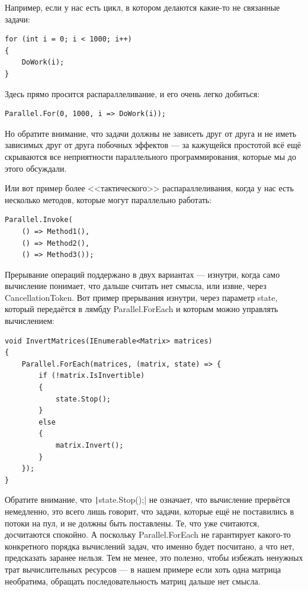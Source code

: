 \documentclass{../../text-style}
\begin{document}
Например, если у нас есть цикл, в котором делаются какие-то не связанные задачи:

\begin{verbatim}
for (int i = 0; i < 1000; i++) 
{
    DoWork(i);
}
\end{verbatim}

Здесь прямо просится распараллеливание, и его очень легко добиться:

\begin{verbatim}
Parallel.For(0, 1000, i => DoWork(i));
\end{verbatim}

Но обратите внимание, что задачи должны не зависеть друг от друга и не иметь зависимых друг от друга побочных эффектов --- за кажущейся простотой всё ещё скрываются все неприятности параллельного программирования, которые мы до этого обсуждали.

Или вот пример более <<тактического>> распараллеливания, когда у нас есть несколько методов, которые могут параллельно работать:

\begin{verbatim}
Parallel.Invoke(
    () => Method1(),
    () => Method2(),
    () => Method3());
\end{verbatim}

Прерывание операций поддержано в двух вариантах --- изнутри, когда само вычисление понимает, что дальше считать нет смысла, или извне, через CancellationToken. Вот пример прерывания изнутри, через параметр state, который передаётся в лямбду Parallel.ForEach и которым можно управлять вычислением:

\begin{verbatim}
void InvertMatrices(IEnumerable<Matrix> matrices)
{
    Parallel.ForEach(matrices, (matrix, state) => {
        if (!matrix.IsInvertible)
        {
            state.Stop();
        }
        else
        {
            matrix.Invert();
        }
    });
}
\end{verbatim}

Обратите внимание, что \texttt|state.Stop();| не означает, что вычисление прервётся немедленно, это всего лишь говорит, что задачи, которые ещё не поставились в потоки на пул, и не должны быть поставлены. Те, что уже считаются, досчитаются спокойно. А поскольку Parallel.ForEach не гарантирует какого-то конкретного порядка вычислений задач, что именно будет посчитано, а что нет, предсказать заранее нельзя. Тем не менее, это полезно, чтобы избежать ненужных трат вычислительных ресурсов --- в нашем примере если хоть одна матрица необратима, обращать последовательность матриц дальше нет смысла.
\end{document}
